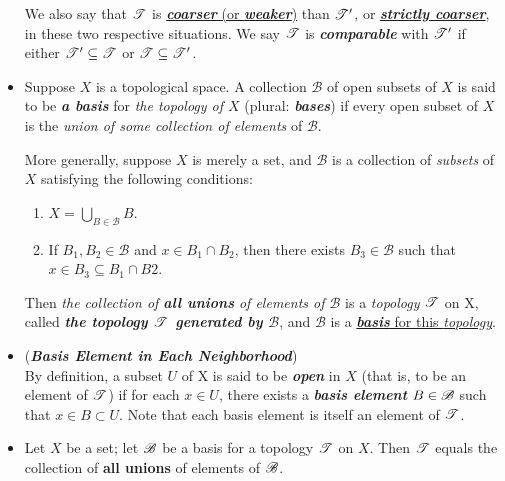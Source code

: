 \documentclass[11pt]{article}
\begin{document}
\begin{itemize}
\begin{definition}
We also say that ${\mathscr T}$ is \underline{\emph{\textbf{coarser}} (or \emph{\textbf{weaker}})} than ${\mathscr T}'$, or \underline{\emph{\textbf{strictly coarser}}}, in these two respective situations. We say ${\mathscr T}$ is \emph{\textbf{comparable}} with  ${\mathscr T}'$ if either ${\mathscr T}' \subseteq {\mathscr T}$ or ${\mathscr T} \subseteq {\mathscr T}'$.
\end{definition}


\item \begin{definition}
Suppose $X$ is a topological space. A collection $\mathscr{B}$ of open subsets of $X$ is said to be \emph{\textbf{a basis}} for \emph{the topology of $X$} (plural: \emph{\textbf{bases}}) if every open subset of $X$ is the \emph{union of some collection of elements} of $\mathscr{B}$.

More generally, suppose $X$ is merely a set, and $\mathscr{B}$ is a collection of \emph{subsets} of $X$ satisfying the following conditions:
\begin{enumerate}
\item $X = \bigcup_{B \in \mathscr{B}}B$.
\item If $B_1, B_2 \in \mathscr{B}$ and $x \in B_1 \cap B_2$, then there exists $B_3 \in \mathscr{B}$ such that $x \in B_3 \subseteq B_1 \cap B2$.
\end{enumerate}
Then \emph{the collection of \textbf{all unions} of elements of $\mathscr{B}$} is a \emph{topology} ${\mathscr T}$ on X, called \emph{\textbf{the topology ${\mathscr T}$ generated by $\mathscr{B}$}}, and $\mathscr{B}$ is a \underline{\emph{\textbf{basis}} for this \emph{topology}}.
\end{definition}

\item \begin{remark} (\emph{\textbf{Basis Element in Each Neighborhood}})\\
By definition, a subset $U$ of X is said to be \emph{\textbf{open}} in $X$ (that is, to be an element of ${\mathscr T}$) if for each $x \in U$, there exists a \emph{\textbf{basis element}} $B \in {\mathscr B}$ such that $x \in B \subset U$. Note that each basis element is itself an element of ${\mathscr T}$.
\end{remark}

\item \begin{lemma}
Let $X$ be a set; let ${\mathscr B}$ be a basis for a topology ${\mathscr T}$ on $X$. Then ${\mathscr T}$ equals the collection of \textbf{all unions} of elements of ${\mathscr B}$.
\end{lemma}


\end{itemize}
\end{document}
